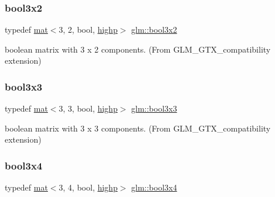 \subsubsection{\texorpdfstring{bool3x2}{bool3x2}}
{\footnotesize\ttfamily typedef \mbox{\hyperlink{structglm_1_1mat}{mat}}$<$3, 2, bool, \mbox{\hyperlink{namespaceglm_a36ed105b07c7746804d7fdc7cc90ff25ac6f7eab42eacbb10d59a58e95e362074}{highp}}$>$ \mbox{\hyperlink{group__gtx__compatibility_ga24674530ea1f5c4e78ba3932dcd7504a}{glm\+::bool3x2}}}



boolean matrix with 3 x 2 components. (From G\+L\+M\+\_\+\+G\+T\+X\+\_\+compatibility extension) 

\mbox{\label{group__gtx__compatibility_gac56217a837f277fa163565d9858f66cf}} 
\subsubsection{\texorpdfstring{bool3x3}{bool3x3}}
{\footnotesize\ttfamily typedef \mbox{\hyperlink{structglm_1_1mat}{mat}}$<$3, 3, bool, \mbox{\hyperlink{namespaceglm_a36ed105b07c7746804d7fdc7cc90ff25ac6f7eab42eacbb10d59a58e95e362074}{highp}}$>$ \mbox{\hyperlink{group__gtx__compatibility_gac56217a837f277fa163565d9858f66cf}{glm\+::bool3x3}}}



boolean matrix with 3 x 3 components. (From G\+L\+M\+\_\+\+G\+T\+X\+\_\+compatibility extension) 

\mbox{\label{group__gtx__compatibility_ga3bec11b90dfdd4c6b37af3ae6e8f7c29}} 
\subsubsection{\texorpdfstring{bool3x4}{bool3x4}}
{\footnotesize\ttfamily typedef \mbox{\hyperlink{structglm_1_1mat}{mat}}$<$3, 4, bool, \mbox{\hyperlink{namespaceglm_a36ed105b07c7746804d7fdc7cc90ff25ac6f7eab42eacbb10d59a58e95e362074}{highp}}$>$ \mbox{\hyperlink{group__gtx__compatibility_ga3bec11b90dfdd4c6b37af3ae6e8f7c29}{glm\+::bool3x4}}}



